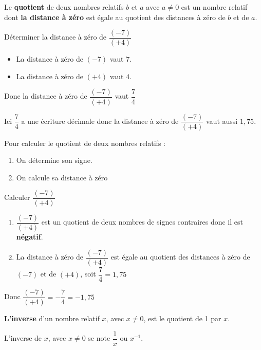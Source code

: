 \begin{propriete}
  Le \textbf{quotient} de deux nombres relatifs $b$ et $a$ avec $a\not=0$ est un nombre relatif 
  dont \textbf{la distance à zéro} est égale au quotient des distances à zéro de $b$ et de $a$.
\end{propriete}

\begin{exemple*1}
  Déterminer la distance à zéro de $\dfrac{(-7)}{(+4)}$
  \correction  
  \begin{itemize}
    \item La distance à zéro de $(-7)$ vaut $7$.
    \item La distance à zéro de $(+4)$ vaut $4$.
  \end{itemize}  
  Donc la distance à zéro de $\dfrac{(-7)}{(+4)}$ vaut $\dfrac{7}{4}$

  Ici $\dfrac{7}{4}$ a une écriture décimale donc la distance à zéro de $\dfrac{(-7)}{(+4)}$ vaut aussi $1,75$.
\end{exemple*1}

\begin{methode*1}
  Pour calculer le quotient de deux nombres relatifs :
  \begin{enumerate}
    \item On détermine son signe.
    \item On calcule sa distance à zéro
  \end{enumerate}
  \exercice
  Calculer $\dfrac{(-7)}{(+4)}$
  \correction
  \begin{enumerate}
    \item $\dfrac{(-7)}{(+4)}$ est un quotient de deux nombres de signes contraires donc il est \textbf{négatif}.
    \item La distance à zéro de $\dfrac{(-7)}{(+4)}$ est égale au quotient des distances à zéro de $(-7)$ et de $(+4)$,
    soit $\dfrac{7}{4} = 1,75$
  \end{enumerate}
  Donc $\dfrac{(-7)}{(+4)} = -\dfrac{7}{4} = -1,75$
\end{methode*1}

\begin{definition}
  \textbf{L'inverse} d'un nombre relatif $x$, avec $x\not=0$, est le quotient de 1 par $x$.
\end{definition}

\begin{notation}
  L'inverse de $x$, avec $x\not=0$ se note $\dfrac{1}{x}$ ou $x^{-1}$.
\end{notation}

